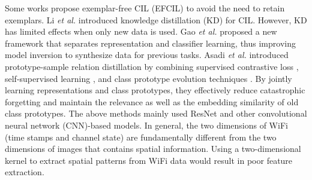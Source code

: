 Some works propose exemplar-free CIL (EFCIL) to avoid the need to retain exemplars.
Li \textit{et al.} \cite{li2017learning} introduced knowledge distillation (KD) for CIL.
However, KD has limited effects when only new data is used.
Gao \textit{et al.} \cite{gao2022r} proposed a new framework that separates representation and classifier learning, thus improving model inversion to synthesize data for previous tasks.
Asadi \textit{et al.} \cite{asadi2023prototype} introduced prototype-sample relation distillation by combining supervised contrastive loss \cite{khosla2020supervised}, self-supervised learning \cite{liu2021self}, and class prototype evolution techniques \cite{de2021continual}. 
By jointly learning representations and class prototypes, they effectively reduce catastrophic forgetting and maintain the relevance as well as the embedding similarity of old class prototypes.
The above methods mainly used ResNet and other convolutional neural network (CNN)-based models.
In general, the two dimensions of WiFi (time stamps and channel state) are fundamentally different from the two dimensions of images that contains spatial information.
Using a two-dimensional kernel to extract spatial patterns from WiFi data would result in poor feature extraction.


